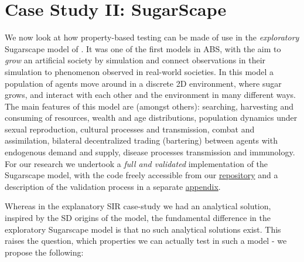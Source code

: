 \section{Case Study II: SugarScape}
\label{sec:case_sug}
We now look at how property-based testing can be made of use in the \textit{exploratory} Sugarscape model of . It was one of the first models in ABS, with the aim to \textit{grow} an artificial society by simulation and connect observations in their simulation to phenomenon observed in real-world societies. In this model a population of agents move around in a discrete 2D environment, where sugar grows, and interact with each other and the environment in many different ways. The main features of this model are (amongst others): searching, harvesting and consuming of resources, wealth and age distributions, population dynamics under sexual reproduction, cultural processes and transmission, combat and assimilation, bilateral decentralized trading (bartering) between agents with endogenous demand and supply, disease processes transmission and immunology. For our research we undertook a \textit{full and validated} implementation of the Sugarscape model, with the code freely accessible from our \href{https://github.com/thalerjonathan/haskell-sugarscape}{repository} and a description of the validation process in a separate \href{https://github.com/thalerjonathan/phd/blob/master/public/propabs/appendix_validating_sugarscape.pdf}{appendix}. %

Whereas in the explanatory SIR case-study we had an analytical solution, inspired by the SD origins of the model, the fundamental difference in the exploratory Sugarscape model is that no such analytical solutions exist. This raises the question, which properties we can actually test in such a model - we propose the following:


